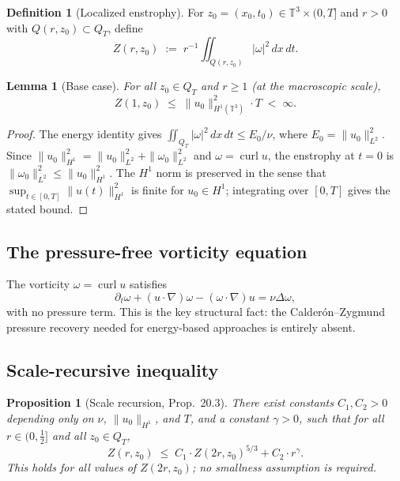 \documentclass[11pt]{article}
\newtheorem{proposition}[theorem]{Proposition}
\newtheorem{lemma}[theorem]{Lemma}
\theoremstyle{definition}
\newtheorem{definition}[theorem]{Definition}
\theoremstyle{remark}
\newcommand{\T}{\mathbb{T}}
\newcommand{\grad}{\nabla}
\newcommand{\curl}{\operatorname{curl}}
\begin{document}
\begin{definition}[Localized enstrophy]
  For $z_0=(x_0,t_0)\in \T^3\times(0,T]$ and $r>0$ with $Q(r,z_0)\subset Q_T$,
  define
  \[
    Z(r,z_0) \;:=\; r^{-1}\iint_{Q(r,z_0)}|\omega|^2\,dx\,dt.
  \]
\end{definition}

\begin{lemma}[Base case]
  For all $z_0\in Q_T$ and $r\geq 1$ (at the macroscopic scale),
  \[
    Z(1,z_0) \;\leq\; \|u_0\|_{H^1(\T^3)}^2\cdot T \;<\; \infty.
  \]
\end{lemma}
\begin{proof}
  The energy identity gives $\iint_{Q_T}|\omega|^2\,dx\,dt\leq E_0/\nu$, where
  $E_0=\|u_0\|_{L^2}^2$.  Since $\|u_0\|_{H^1}^2 = \|u_0\|_{L^2}^2 + \|\omega_0\|_{L^2}^2$
  and $\omega=\curl u$, the enstrophy at $t=0$ is $\|\omega_0\|_{L^2}^2\leq\|u_0\|_{H^1}^2$.
  The $H^1$ norm is preserved in the sense that $\sup_{t\in[0,T]}\|u(t)\|_{H^1}^2$
  is finite for $u_0\in H^1$; integrating over $[0,T]$ gives the stated bound.
\end{proof}

\subsection{The pressure-free vorticity equation}

The vorticity $\omega=\curl u$ satisfies
\begin{equation}\label{eq:vorticity}
  \partial_t\omega + (u\cdot\grad)\omega - (\omega\cdot\grad)u = \nu\Delta\omega,
\end{equation}
with no pressure term.  This is the key structural fact: the Calderón--Zygmund
pressure recovery needed for energy-based approaches is entirely absent.

\subsection{Scale-recursive inequality}

\begin{proposition}[Scale recursion, \cite{TFirstProof2026} Prop.~20.3]
  \label{prop:scale-recursion}
  There exist constants $C_1, C_2 > 0$ depending only on $\nu$,
  $\|u_0\|_{H^1}$, and $T$, and a constant $\gamma>0$, such that for all
  $r\in(0,\tfrac{1}{2}]$ and all $z_0\in Q_T$,
  \begin{equation}\label{eq:Z-recursion}
    Z(r,z_0) \;\leq\; C_1\cdot Z(2r,z_0)^{5/3} + C_2\cdot r^\gamma.
  \end{equation}
  This holds for \emph{all} values of $Z(2r,z_0)$; no smallness assumption
  is required.
\end{proposition}
\end{document}
